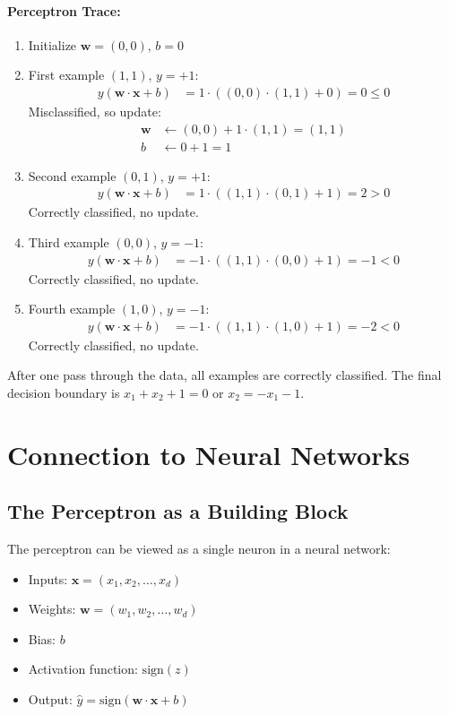 \documentclass{article}
\begin{document}
\paragraph{Perceptron Trace:}
\begin{enumerate}
    \item Initialize $\mathbf{w} = (0,0)$, $b = 0$
    \item First example $(1,1)$, $y = +1$:
    \begin{align}
    y(\mathbf{w} \cdot \mathbf{x} + b) &= 1 \cdot ((0,0) \cdot (1,1) + 0) = 0 \leq 0
    \end{align}
    Misclassified, so update:
    \begin{align}
    \mathbf{w} &\leftarrow (0,0) + 1 \cdot (1,1) = (1,1)\\
    b &\leftarrow 0 + 1 = 1
    \end{align}
    
    \item Second example $(0,1)$, $y = +1$:
    \begin{align}
    y(\mathbf{w} \cdot \mathbf{x} + b) &= 1 \cdot ((1,1) \cdot (0,1) + 1) = 2 > 0
    \end{align}
    Correctly classified, no update.
    
    \item Third example $(0,0)$, $y = -1$:
    \begin{align}
    y(\mathbf{w} \cdot \mathbf{x} + b) &= -1 \cdot ((1,1) \cdot (0,0) + 1) = -1 < 0
    \end{align}
    Correctly classified, no update.
    
    \item Fourth example $(1,0)$, $y = -1$:
    \begin{align}
    y(\mathbf{w} \cdot \mathbf{x} + b) &= -1 \cdot ((1,1) \cdot (1,0) + 1) = -2 < 0
    \end{align}
    Correctly classified, no update.
\end{enumerate}

After one pass through the data, all examples are correctly classified. The final decision boundary is $x_1 + x_2 + 1 = 0$ or $x_2 = -x_1 - 1$.

\section{Connection to Neural Networks}

\subsection{The Perceptron as a Building Block}
The perceptron can be viewed as a single neuron in a neural network:
\begin{itemize}
    \item Inputs: $\mathbf{x} = (x_1, x_2, \ldots, x_d)$
    \item Weights: $\mathbf{w} = (w_1, w_2, \ldots, w_d)$
    \item Bias: $b$
    \item Activation function: $\text{sign}(z)$
    \item Output: $\hat{y} = \text{sign}(\mathbf{w} \cdot \mathbf{x} + b)$
\end{itemize}
\end{document}
